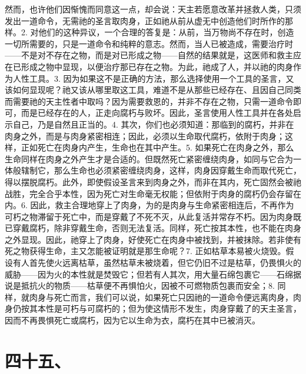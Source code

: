 然而，也许他们因惭愧而同意这一点，却会说：天主若愿意改革并拯救人类，只须发出一道命令，无需祂的圣言取肉身，正如祂从前从虚无中创造他们时所作的那样。2. 对他们的这种异议，一个合理的答复是：从前，当万物尚不存在时，创造一切所需要的，只是一道命令和纯粹的意志。然而，当人已被造成，需要治疗时——不是对不存在之物，而是对已形成之物——自然的结果就是，这医师和救主应在已形成之物中显现，以便治疗那已存在之物。为此，祂成了人，并以祂的肉身作为人性工具。3. 因为如果这不是正确的方法，那么选择使用一个工具的圣言，又该如何显现呢？祂又该从哪里取这工具，难道不是从那些已经存在、且因自己同类而需要祂的天主性者中取吗？因为需要救恩的，并非不存在之物，只需一道命令即可，而是已经存在的人，正走向腐朽与败坏。因此，圣言使用人性工具并在各处启示自己，乃是自然且正当的。4. 其次，你们也必须知道：那临到的腐朽，并非在肉身之外，而是与肉身紧密相连；因此，必须以生命取代腐朽，依附于肉身；这样，正如死亡在肉身内产生，生命也在其中产生。5. 如果死亡在肉身之外，那么生命同样在肉身之外产生才是合适的。但既然死亡紧密缠绕肉身，如同与它合为一体般辖制它，那么生命也必须紧密缠绕肉身，这样，肉身因穿戴生命而取代死亡，得以摆脱腐朽。此外，即使假设圣言来到肉身之外，而非在其内，死亡固然会被祂战胜，完全合乎本性，因为死亡对生命毫无权能；但依附于肉身的腐朽仍会存留在内。6. 因此，救主合理地穿上了肉身，为的是肉身与生命紧密相连后，不再作为可朽之物滞留于死亡中，而是穿戴了不死不灭，从此复活并常存不朽。因为肉身既已穿戴腐朽，除非穿戴生命，否则无法复活。同样，死亡按其本性，也不能在肉身之外显现。因此，祂穿上了肉身，好使死亡在肉身中被找到，并被抹除。若非使有死之物获得生命，主又怎能被证明就是那生命呢？7. 正如枯草本易被火烧毁。假设有人首先使火远离枯草，虽然枯草未被烧着，但它仍旧不过是枯草，仍畏惧火的威胁——因为火的本性就是焚毁它；但若有人其次，用大量石绵包裹它——石绵据说是抵抗火的物质——枯草便不再惧怕火，因被不可燃物质包裹而安全；8. 同样，就肉身与死亡而言，我们可以说，如果死亡只因祂的一道命令便远离肉身，肉身仍按其本性是可朽与可腐朽的；但为使这情形不发生，肉身穿戴了的天主圣言，因而不再畏惧死亡或腐朽，因为它以生命为衣，腐朽在其中已被消灭。\par


\section{四十五、}


